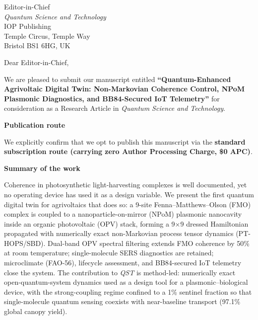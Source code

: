 \documentclass[11pt]{letter}
\begin{document}
\begin{letter}{Editor-in-Chief\\
\textit{Quantum Science and Technology}\\
IOP Publishing\\
Temple Circus, Temple Way\\
Bristol BS1 6HG, UK}

\opening{Dear Editor-in-Chief,}

We are pleased to submit our manuscript entitled \textbf{``Quantum-Enhanced Agrivoltaic Digital Twin: Non-Markovian Coherence Control, NPoM Plasmonic Diagnostics, and BB84-Secured IoT Telemetry''} for consideration as a Research Article in \textit{Quantum Science and Technology}.

\noindent\textbf{Publication route}

\noindent We explicitly confirm that we opt to publish this manuscript via the \textbf{standard subscription route (carrying zero Author Processing Charge, \$0 APC)}.

\vspace{0.3em}
\noindent\textbf{Summary of the work}

\noindent Coherence in photosynthetic light-harvesting complexes is well documented, yet no operating device has used it as a design variable. We present the first quantum digital twin for agrivoltaics that does so: a 9-site Fenna--Matthews--Olson (FMO) complex is coupled to a nanoparticle-on-mirror (NPoM) plasmonic nanocavity inside an organic photovoltaic (OPV) stack, forming a 9$\times$9 dressed Hamiltonian propagated with numerically exact non-Markovian process tensor dynamics (PT-HOPS/SBD). Dual-band OPV spectral filtering extends FMO coherence by 50\% at room temperature; single-molecule SERS diagnostics are retained; microclimate (FAO-56), lifecycle assessment, and BB84-secured IoT telemetry close the system. The contribution to \textit{QST} is method-led: numerically exact open-quantum-system dynamics used as a design tool for a plasmonic--biological device, with the strong-coupling regime confined to a 1\% sentinel fraction so that single-molecule quantum sensing coexists with near-baseline transport (97.1\% global canopy yield).


\end{letter}
\end{document}
